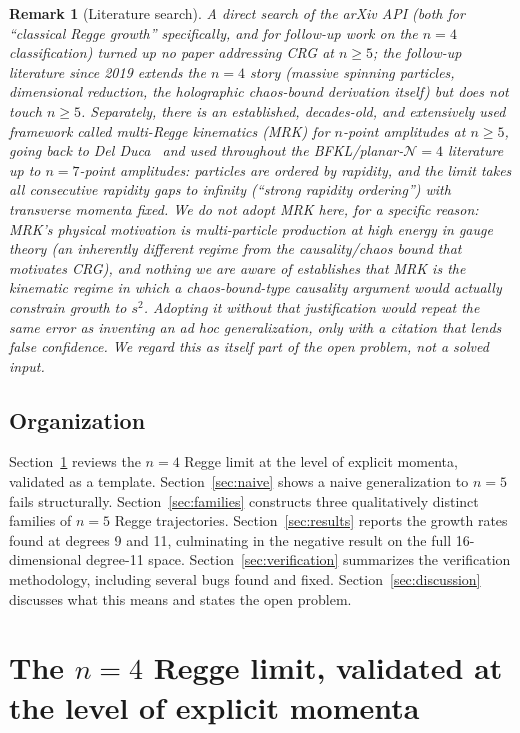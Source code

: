 \documentclass[reqno]{amsart}
\newtheorem{remark}[theorem]{Remark}
\begin{document}
\begin{remark}[Literature search]
A direct search of the arXiv API (both for ``classical Regge growth'' specifically, and for
follow-up work on the $n=4$ classification) turned up no paper addressing CRG at $n\geq5$; the
follow-up literature since 2019 extends the $n=4$ story (massive spinning particles, dimensional
reduction, the holographic chaos-bound derivation itself) but does not touch $n\geq5$. Separately,
there is an established, decades-old, and extensively used framework called \emph{multi-Regge
kinematics} (MRK) for $n$-point amplitudes at $n\geq5$, going back to Del
Duca~\cite{delduca1993} and used throughout the BFKL/planar-$\mathcal{N}=4$ literature up to
$n=7$-point amplitudes: particles are ordered by rapidity, and the limit takes all consecutive
rapidity gaps to infinity (``strong rapidity ordering'') with transverse momenta fixed. We do
\emph{not} adopt MRK here, for a specific reason: MRK's physical motivation is multi-particle
production at high energy in gauge theory (an inherently different regime from the causality/chaos
bound that motivates CRG), and nothing we are aware of establishes that MRK is the kinematic
regime in which a chaos-bound-type causality argument would actually constrain growth to $s^2$.
Adopting it without that justification would repeat the same error as inventing an ad hoc
generalization, only with a citation that lends false confidence. We regard this as itself part of
the open problem, not a solved input.
\end{remark}

\subsection*{Organization} Section~\ref{sec:n4} reviews the $n=4$ Regge limit at the level of
explicit momenta, validated as a template. Section~\ref{sec:naive} shows a naive generalization to
$n=5$ fails structurally. Section~\ref{sec:families} constructs three qualitatively distinct
families of $n=5$ Regge trajectories. Section~\ref{sec:results} reports the growth rates found at
degrees 9 and 11, culminating in the negative result on the full 16-dimensional degree-11 space.
Section~\ref{sec:verification} summarizes the verification methodology, including several bugs
found and fixed. Section~\ref{sec:discussion} discusses what this means and states the open
problem.

\section{The \texorpdfstring{$n=4$}{n=4} Regge limit, validated at the level of explicit momenta}
\label{sec:n4}
\end{document}
